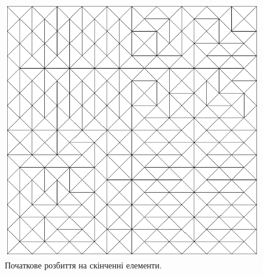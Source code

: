 \begin{figure}[H]
	\centering
    \includegraphics[scale=0.7]{problem1/InitialMesh}
    \caption{Початкове розбиття на скінченні елементи.}
    \label{fig:init_mesh1}
\end{figure}


